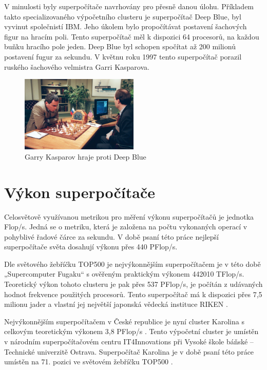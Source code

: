 V minulosti byly superpočítače navrhovány pro přesně danou úlohu. Příkladem takto specializovaného výpočetního clusteru je superpočítač Deep Blue, byl vyvinut společnistí IBM. Jeho úkolem bylo propočítávat postavení šachových figur na hracím poli. Tento superpočítač měl k dispozici 64 procesorů, na každou buňku hracího pole jeden. Deep Blue byl schopen spočítat až 200 milionů postavení fugur za sekundu. V květnu roku 1997 tento superpočítač porazil ruského šachového velmistra Garri Kasparova.\cite{Hosch20191128}

\begin{figure}[h]
	\centering
	\includegraphics[width=0.5\textwidth]{Figures/Garry-Kasparov-playing-against-Deep-Blue.jpeg}
	\caption{Garry Kasparov hraje proti Deep Blue \cite{Hosch20191128}}
	\label{fig:garry-kasparov}
\end{figure}

\section{Výkon superpočítače}
Celosvětově využívanou metrikou pro měření výkonu superpočítačů je jednotka Flop/s. Jedná se o metriku, která je založena na počtu vykonaných operací v pohyblivé řadové čárce za sekundu. V době psaní této práce nejlepší superpočítače světa dosahují výkonu přes 440 PFlop/s.

Dle světového žebříčku TOP500 je nejvýkonnějším superpočítačem je v této době 
„Supercomputer Fugaku“ s ověřeným praktickým výkonem 442010 TFlop/s. Teoretický výkon tohoto clusteru je pak přes 537 PFlop/s, je počítán z udávaných hodnot frekvence použitých procesorů. Tento superpočítač má k dispozici přes 7,5 milionu jader a vlastní jej největší japonská vědecká instituce RIKEN \cite{B2TvJy8L3mSIxfWp}.

Nejvýkonnějším superpočítačem v České republice je nyní cluster Karolina s celkovým teoretickým výkonem 3,8 PFlop/s \cite{oviOzaWRPKlKSq7K}. Tento výpočetní cluster je umístěn v národním superpočítačovém centru IT4Innovations při Vysoké škole báňské – Technické univerzitě Ostrava. Superpočítač Karolina je v době psaní této práce umístěn na 71. pozici ve světovém žebříčku TOP500 \cite{iqgLoV1cXM0Qb6t1}.

